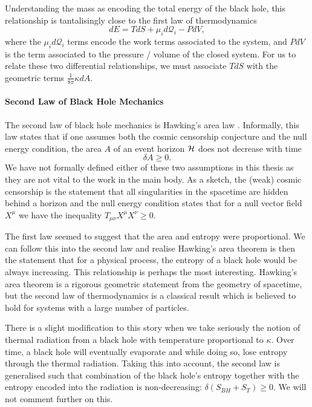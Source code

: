 Understanding the mass as encoding the total energy of the black hole, this relationship is tantalisingly close to the first law of thermodynamics
\begin{equation*}
	dE = T dS + \mu_i d\mathcal{Q}_i - PdV,
\end{equation*}
where the $\mu_i d\mathcal{Q}_i$ terms encode the work terms associated to the system, and $PdV$ is the term associated to the pressure / volume of the closed system. For us to relate these two differential relationships, we must associate $T dS$ with the geometric terms $\frac{1}{8\pi} \kappa dA$. 

\paragraph{Second Law of Black Hole Mechanics}

The second law of black hole mechanics is Hawking's area law \cite{Hawking:1971vc}. Informally, this law states that if one assumes both the cosmic censorship conjecture and the null energy condition, the area $A$ of an event horizon ${\cal H}$ does not decrease with time
\begin{equation*}
	\delta A \geq 0.
\end{equation*}
We have not formally defined either of these two assumptions in this thesis as they are not vital to the work in the main body. As a sketch, the (weak) cosmic censorship is the statement that all singularities in the spacetime are hidden behind a horizon and the null energy condition states that for a null vector field $X^\mu$ we have the inequality $T_{\mu \nu} X^\mu X^\nu \geq 0$. 

The first law seemed to suggest that the area and entropy were proportional. We can follow this into the second law and realise Hawking's area theorem is then the statement that for a physical process, the entropy of a black hole would be always increasing. This relationship is perhaps the most interesting. Hawking's area theorem is a rigorous geometric statement from the geometry of spacetime, but the second law of thermodynamics is a classical result which is believed to hold for systems with a large number of particles. 

There is a slight modification to this story when we take seriously the notion of thermal radiation from a black hole with temperature proportional to $\kappa$. Over time, a black hole will eventually evaporate and while doing so, lose entropy through the thermal radiation. Taking this into account, the second law is generalised such that combination of the black hole's entropy together with the entropy encoded into the radiation is non-decreasing: $\delta(S_{BH} + S_{T}) \geq 0 $\cite{BekensteinGeneralised}. We will not comment further on this.


